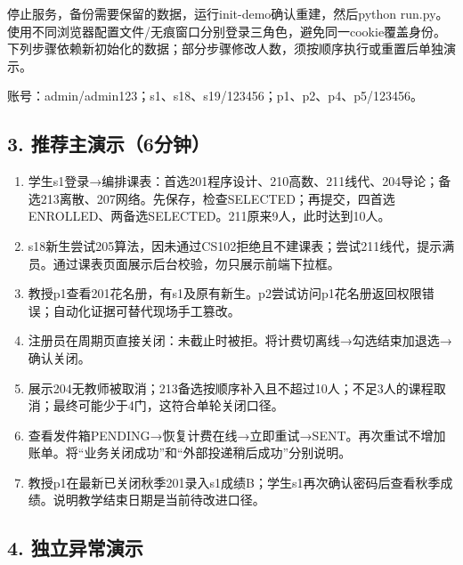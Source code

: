 \documentclass[UTF8,11pt,a4paper]{ctexart}
\providecommand{\tightlist}{\setlength{\itemsep}{0pt}\setlength{\parskip}{0pt}}
\begin{document}
停止服务，备份需要保留的数据，运行init-demo确认重建，然后python
run.py。使用不同浏览器配置文件/无痕窗口分别登录三角色，避免同一cookie覆盖身份。下列步骤依赖新初始化的数据；部分步骤修改人数，须按顺序执行或重置后单独演示。

账号：admin/admin123；s1、s18、s19/123456；p1、p2、p4、p5/123456。

\hypertarget{3-ux63a8ux8350ux4e3bux6f14ux793a6ux5206ux949f}{%
\subsection{3.
推荐主演示（6分钟）}\label{3-ux63a8ux8350ux4e3bux6f14ux793a6ux5206ux949f}}

\begin{enumerate}
\def\labelenumi{\arabic{enumi}.}
\tightlist
\item
  学生s1登录→编排课表：首选201程序设计、210高数、211线代、204导论；备选213离散、207网络。先保存，检查SELECTED；再提交，四首选ENROLLED、两备选SELECTED。211原来9人，此时达到10人。
\item
  s18新生尝试205算法，因未通过CS102拒绝且不建课表；尝试211线代，提示满员。通过课表页面展示后台校验，勿只展示前端下拉框。
\item
  教授p1查看201花名册，有s1及原有新生。p2尝试访问p1花名册返回权限错误；自动化证据可替代现场手工篡改。
\item
  注册员在周期页直接关闭：未截止时被拒。将计费切离线→勾选结束加退选→确认关闭。
\item
  展示204无教师被取消；213备选按顺序补入且不超过10人；不足3人的课程取消；最终可能少于4门，这符合单轮关闭口径。
\item
  查看发件箱PENDING→恢复计费在线→立即重试→SENT。再次重试不增加账单。将``业务关闭成功''和``外部投递稍后成功''分别说明。
\item
  教授p1在最新已关闭秋季201录入s1成绩B；学生s1再次确认密码后查看秋季成绩。说明教学结束日期是当前待改进口径。
\end{enumerate}

\hypertarget{4-ux72ecux7acbux5f02ux5e38ux6f14ux793a}{%
\subsection{4.
独立异常演示}\label{4-ux72ecux7acbux5f02ux5e38ux6f14ux793a}}
\end{document}
